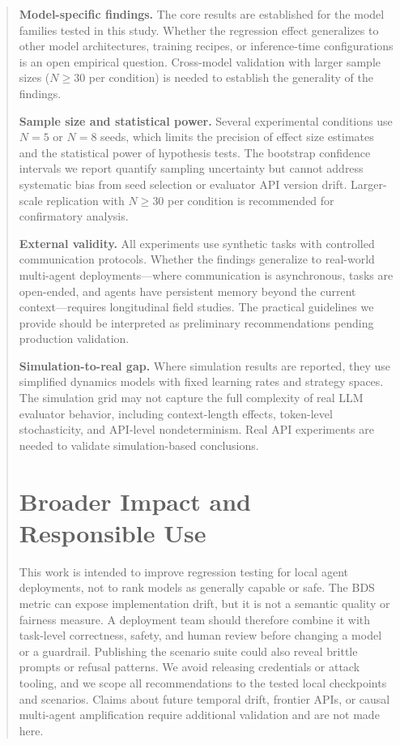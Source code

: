 \documentclass[11pt]{article}
\begin{document}
\begin{abstract}
\textbf{Model-specific findings.} The core results are established for the model families tested in this study. Whether the regression effect generalizes to other model architectures, training recipes, or inference-time configurations is an open empirical question. Cross-model validation with larger sample sizes ($N{\geq}30$ per condition) is needed to establish the generality of the findings.

\textbf{Sample size and statistical power.} Several experimental conditions use $N{=}5$ or $N{=}8$ seeds, which limits the precision of effect size estimates and the statistical power of hypothesis tests. The bootstrap confidence intervals we report quantify sampling uncertainty but cannot address systematic bias from seed selection or evaluator API version drift. Larger-scale replication with $N{\geq}30$ per condition is recommended for confirmatory analysis.

\textbf{External validity.} All experiments use synthetic tasks with controlled communication protocols. Whether the findings generalize to real-world multi-agent deployments—where communication is asynchronous, tasks are open-ended, and agents have persistent memory beyond the current context—requires longitudinal field studies. The practical guidelines we provide should be interpreted as preliminary recommendations pending production validation.

\textbf{Simulation-to-real gap.} Where simulation results are reported, they use simplified dynamics models with fixed learning rates and strategy spaces. The simulation grid may not capture the full complexity of real LLM evaluator behavior, including context-length effects, token-level stochasticity, and API-level nondeterminism. Real API experiments are needed to validate simulation-based conclusions.

\section{Broader Impact and Responsible Use}
\label{sec:broader}

This work is intended to improve regression testing for local agent
deployments, not to rank models as generally capable or safe. The BDS metric
can expose implementation drift, but it is not a semantic quality or fairness
measure. A deployment team should therefore combine it with task-level
correctness, safety, and human review before changing a model or a guardrail.
Publishing the scenario suite could also reveal brittle prompts or refusal
patterns. We avoid releasing credentials or attack tooling, and we scope all
recommendations to the tested local checkpoints and scenarios. Claims about
future temporal drift, frontier APIs, or causal multi-agent amplification
require additional validation and are not made here.


\end{abstract}
\end{document}
